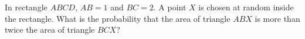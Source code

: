 In rectangle $ABCD$, $AB=1$ and $BC=2$. A point $X$ is chosen at random inside the rectangle. What is the probability that the area of triangle $ABX$ is more than twice the area of triangle $BCX$?
